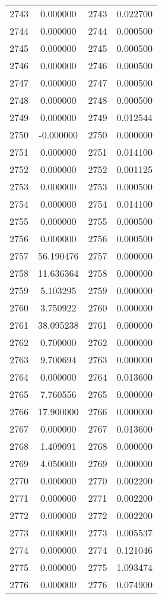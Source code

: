 \documentclass[12pt]{article}
\begin{document}
\begin{longtable}{@{}cccc@{}}
2743 & 0.000000 & 2743 & 0.022700 \\
2744 & 0.000000 & 2744 & 0.000500 \\
2745 & 0.000000 & 2745 & 0.000500 \\
2746 & 0.000000 & 2746 & 0.000500 \\
2747 & 0.000000 & 2747 & 0.000500 \\
2748 & 0.000000 & 2748 & 0.000500 \\
2749 & 0.000000 & 2749 & 0.012544 \\
2750 & -0.000000 & 2750 & 0.000000 \\
2751 & 0.000000 & 2751 & 0.014100 \\
2752 & 0.000000 & 2752 & 0.001125 \\
2753 & 0.000000 & 2753 & 0.000500 \\
2754 & 0.000000 & 2754 & 0.014100 \\
2755 & 0.000000 & 2755 & 0.000500 \\
2756 & 0.000000 & 2756 & 0.000500 \\
2757 & 56.190476 & 2757 & 0.000000 \\
2758 & 11.636364 & 2758 & 0.000000 \\
2759 & 5.103295 & 2759 & 0.000000 \\
2760 & 3.750922 & 2760 & 0.000000 \\
2761 & 38.095238 & 2761 & 0.000000 \\
2762 & 0.700000 & 2762 & 0.000000 \\
2763 & 9.700694 & 2763 & 0.000000 \\
2764 & 0.000000 & 2764 & 0.013600 \\
2765 & 7.760556 & 2765 & 0.000000 \\
2766 & 17.900000 & 2766 & 0.000000 \\
2767 & 0.000000 & 2767 & 0.013600 \\
2768 & 1.409091 & 2768 & 0.000000 \\
2769 & 4.050000 & 2769 & 0.000000 \\
2770 & 0.000000 & 2770 & 0.002200 \\
2771 & 0.000000 & 2771 & 0.002200 \\
2772 & 0.000000 & 2772 & 0.002200 \\
2773 & 0.000000 & 2773 & 0.005537 \\
2774 & 0.000000 & 2774 & 0.121046 \\
2775 & 0.000000 & 2775 & 1.093474 \\
2776 & 0.000000 & 2776 & 0.074900 \\

\end{longtable}
\end{document}
